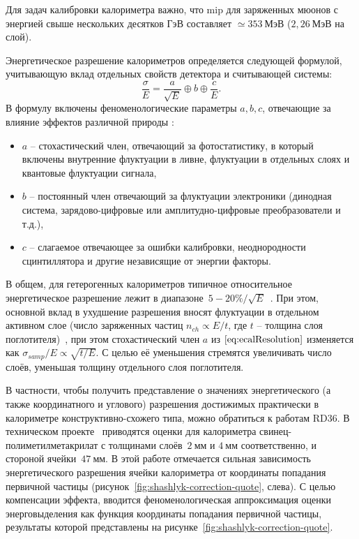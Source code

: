 Для задач калибровки калориметра важно, что \acrshort{mip} для
заряженных мюонов с энергией свыше нескольких десятков ГэВ
составляет $\simeq353~\text{МэВ}$ ($2{,}26~\text{МэВ}$ на слой).


Энергетическое разрешение калориметров определяется следующей
формулой, учитывающую вклад отдельных свойств детектора и считывающей системы:
\begin{equation}
    \frac{\sigma}{E} = \frac{a}{\sqrt{E}} \oplus b \oplus \frac{c}{E}.
    \label{eq:ecalResolution}
\end{equation}
В формулу включены феноменологические параметры $a, b, c$, отвечающие за
влияние эффектов различной природы \cite{CalorimetryPPhFabiola}:
\begin{itemize}
    \item $a$ -- стохастический член, отвечающий за фотостатистику,
    в который включены внутренние флуктуации в ливне, флуктуации
    в отдельных слоях и квантовые флуктуации сигнала,
    \item $b$ -- постоянный член отвечающий за флуктуации
    электроники (динодная система, зарядово-цифровые или
    амплитудно-цифровые преобразователи и т.д.),
    \item $c$ -- слагаемое отвечающее за ошибки калибровки,
    неоднородности сцинтиллятора и другие независящие от энергии
    факторы.
\end{itemize}

В общем, для гетерогенных калориметров типичное относительное
энергетическое разрешение лежит в
диапазоне~$5-20\%/\sqrt{E}$~\cite{CalorimetryPPhFabiola}.
При этом, основной вклад в
ухудшение разрешения вносят флуктуации в отдельном активном слое (число
заряженных частиц $n_{ch} \propto E/t$, где $t$ -- толщина слоя
поглотителя)~\cite{grupenDetectors2008, wigmansCalorimetry},
при этом стохастический член $a$ из $\eqref{eq:ecalResolution}$
изменяется как $\sigma_{samp}/E \propto \sqrt{t/E}$.
С целью её уменьшения стремятся увеличивать число слоёв,
уменьшая толщину отдельного слоя поглотителя.

В частности, чтобы получить представление о значениях энергетического
(а также координатного и углового) разрешения достижимых
практически в калориметре конструктивно-схожего типа, можно
обратиться к работам RD36. В техническом проекте~\cite{rd36-shashlik-1996}
приводятся оценки для калориметра свинец-полиметилметакрилат с
толщинами слоёв~$2~\text{мм}$ и $4~\text{мм}$ соответственно, и
стороной ячейки~$47~\text{мм}$. В этой работе отмечается сильная
зависимость энергетического разрешения ячейки калориметра от
координаты попадания первичной частицы
(рисунок~\ref{fig:shashlyk-correction-quote}, слева). С целью
компенсации эффекта,
вводится феноменологическая аппроксимация оценки энерговыделения
как функция координаты попадания первичной частицы, результаты которой
представлены на рисунке~\ref{fig:shashlyk-correction-quote}.

